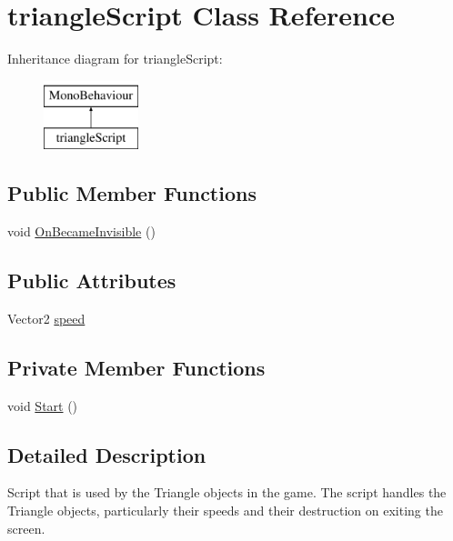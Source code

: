 \hypertarget{classtriangle_script}{\section{triangle\-Script Class Reference}
\label{classtriangle_script}
}
Inheritance diagram for triangle\-Script\-:\begin{figure}[H]
\begin{center}
\leavevmode
\includegraphics[height=2.000000cm]{classtriangle_script}
\end{center}
\end{figure}
\subsection*{Public Member Functions}
\begin{DoxyCompactItemize}
\item 
void \hyperlink{classtriangle_script_a6deb98a0bb688a322a75d03e61e6e5e8}{On\-Became\-Invisible} ()
\end{DoxyCompactItemize}
\subsection*{Public Attributes}
\begin{DoxyCompactItemize}
\item 
Vector2 \hyperlink{classtriangle_script_a6bfdbe74d4572da3bac0362003649747}{speed}
\end{DoxyCompactItemize}
\subsection*{Private Member Functions}
\begin{DoxyCompactItemize}
\item 
void \hyperlink{classtriangle_script_ab63e77d33e9bd070628898b9926a7dad}{Start} ()
\end{DoxyCompactItemize}


\subsection{Detailed Description}
Script that is used by the Triangle objects in the game. The script handles the Triangle objects, particularly their speeds and their destruction on exiting the screen. 


